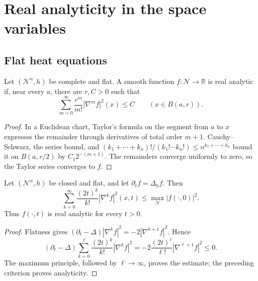 \section{Real analyticity in the space variables}

\subsection{Flat heat equations}

\begin{example}
\label{ex:chow-ii-flat-factorial-analyticity-criterion}

Let \((\mathcal N^n,h)\) be complete and flat.  A smooth function
\(f:\mathcal N\to\mathbb R\) is real analytic if, near every \(a\), there
are \(r,C>0\) such that
\[
 \sum_{m=0}^{\infty}\frac{r^m}{m!}|\nabla^mf|^2(x)\leq C
 \qquad(x\in B(a,r)).
\]
\end{example}
\begin{proof}
\sketch
In a Euclidean chart, Taylor's formula on the segment from \(a\) to \(x\)
expresses the remainder through derivatives of total order \(m+1\).
Cauchy--Schwarz, the series bound, and
\((k_1+\cdots+k_n)!/(k_1!\cdots k_n!)\leq n^{k_1+\cdots+k_n}\) bound it on
\(B(a,r/2)\) by \(C_1 2^{-(m+1)}\).  The remainders converge uniformly to
zero, so the Taylor series converges to \(f\).
\end{proof}

\begin{proposition}
\label{prop:chow-ii-flat-heat-real-analyticity}

Let \((\mathcal N^n,h)\) be closed and flat, and let
\(\partial_tf=\Delta_hf\).  Then
\[
 \sum_{k=0}^{\infty}\frac{(2t)^k}{k!}|\nabla^kf|^2(x,t)
 \leq\max_{\mathcal N}|f(\cdot,0)|^2.
\]
Thus \(f(\cdot,t)\) is real analytic for every \(t>0\).
\end{proposition}
\begin{proof}
\sketch
{}
Flatness gives
\((\partial_t-\Delta)|\nabla^kf|^2=-2|\nabla^{k+1}f|^2\).  Hence
\[
 (\partial_t-\Delta)\sum_{k=0}^{\ell}
 \frac{(2t)^k}{k!}|\nabla^kf|^2
 =-2\frac{(2t)^\ell}{\ell!}|\nabla^{\ell+1}f|^2\leq0.
\]
The maximum principle, followed by \(\ell\to\infty\), proves the estimate;
the preceding criterion proves analyticity.
\end{proof}

